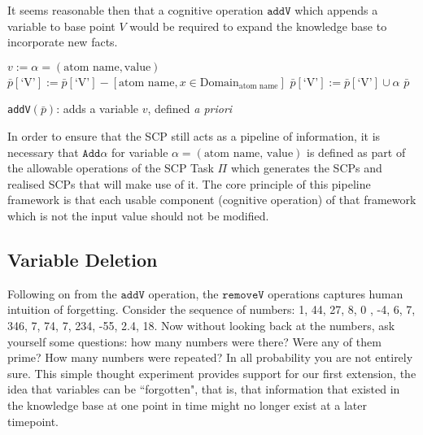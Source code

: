 It seems reasonable then that a cognitive operation $\texttt{addV}$ which appends a variable to base point $V$ would be required to expand the knowledge base to incorporate new facts.

\begin{algorithm}[H] 
\SetAlgoLined
{}
$v:= \alpha=(\text{atom name},\text{value})$\;
{
$\bar{p}[\textrm{`V'}]:=\bar{p}[\textrm{`V'}] - [\text{atom name}, x \in \text{Domain}_\text{atom name}] $
$\bar{p}[\textrm{`V'}]:=\bar{p}[\textrm{`V'}] \cup \alpha$\;
\Return $\bar{p}$
}

\caption{\texttt{addV}$(\bar{p})$: adds a variable $v$, defined \textit{a priori}}
\label{cogOp:addV}
\end{algorithm}

In order to ensure that the SCP still acts as a pipeline of information, it is necessary that $\texttt{Add}\alpha$ for variable $\alpha=(\text{atom name, value})$ is defined as part of the allowable operations of the SCP Task $\Pi$ which generates the SCPs and realised SCPs that will make use of it. The core principle of this pipeline framework is that each usable component (cognitive operation) of that framework which is not the input value should not be modified.

\subsection{Variable Deletion} \label{ssec:deletion}
Following on from the $\texttt{addV}$ operation, the $\texttt{removeV}$ operations captures human intuition of forgetting. Consider the sequence of numbers: 1, 44, 27, 8, 0 , -4, 6, 7, 346, 7, 74, 7, 234, -55, 2.4, 18. Now without looking back at the numbers, ask yourself some questions: how many numbers were there? Were any of them prime? How many numbers were repeated? In all probability you are not entirely sure. This simple thought experiment provides support for our first extension, the idea that variables can be ``forgotten", that is, that information that existed in the knowledge base at one point in time might no longer exist at a later timepoint. 

